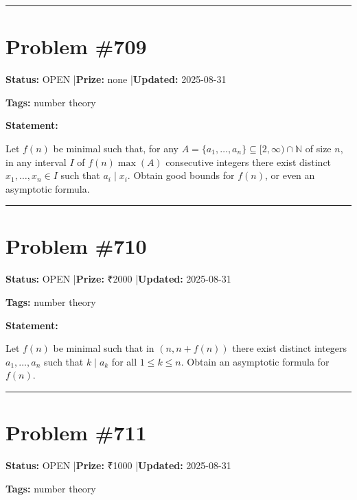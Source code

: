 \documentclass{article}
\begin{document}
\noindent\rule{\linewidth}{0.4pt}


\section{Problem \#709}
\label{prob:709}

\noindent\textbf{Status:} OPEN \quad|\quad \textbf{Prize:} none \quad|\quad \textbf{Updated:} 2025-08-31

\noindent\textbf{Tags:} number theory

\medskip

\noindent\textbf{Statement:}

Let $f(n)$ be minimal such that, for any $A=\{a_1,\ldots,a_n\}\subseteq [2,\infty)\cap\mathbb{N}$ of size $n$, in any interval $I$ of $f(n)\max(A)$ consecutive integers there exist distinct $x_1,\ldots,x_n\in I$ such that $a_i\mid x_i$. Obtain good bounds for $f(n)$, or even an asymptotic formula.

\noindent\rule{\linewidth}{0.4pt}


\section{Problem \#710}
\label{prob:710}

\noindent\textbf{Status:} OPEN \quad|\quad \textbf{Prize:} ₹2000 \quad|\quad \textbf{Updated:} 2025-08-31

\noindent\textbf{Tags:} number theory

\medskip

\noindent\textbf{Statement:}

Let $f(n)$ be minimal such that in $(n,n+f(n))$ there exist distinct integers $a_1,\ldots,a_n$ such that $k\mid a_k$ for all $1\leq k\leq n$. Obtain an asymptotic formula for $f(n)$.

\noindent\rule{\linewidth}{0.4pt}


\section{Problem \#711}
\label{prob:711}

\noindent\textbf{Status:} OPEN \quad|\quad \textbf{Prize:} ₹1000 \quad|\quad \textbf{Updated:} 2025-08-31

\noindent\textbf{Tags:} number theory
\end{document}

